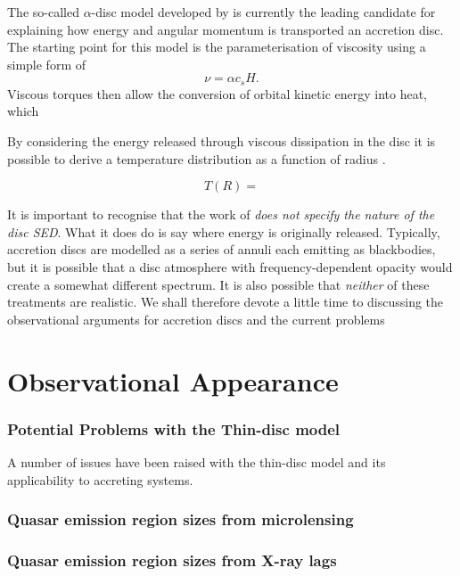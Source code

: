 The so-called $\alpha$-disc model developed by \cite[][hereafter SS73]{shakurasunyaev1973} is
currently the leading candidate for explaining how energy and angular momentum
is transported an accretion disc. The starting point for this model is the parameterisation
of viscosity using a simple form of
\begin{equation}
\nu = \alpha c_s H.
\end{equation}
Viscous torques then allow the conversion of orbital kinetic energy into heat, which 


By considering the energy released through viscous dissipation 
in the disc it is possible to derive a temperature distribution as a function of 
radius \citep{shakurasunyaev1973, fkrbook}. 

\begin{equation}
T(R) =  
\end{equation}

It is important to recognise that the work of \cite{shakurasunyaev1973} 
{\sl does not specify the nature of the disc SED}. What it does do is 
say where energy is originally released. Typically,
accretion discs are modelled as a series of annuli each emitting 
as blackbodies, but it is possible that a disc atmosphere with frequency-dependent
opacity would create a somewhat different spectrum. It is also possible that {\em neither} of these 
treatments are realistic. We shall therefore devote a little time to discussing
the observational arguments for accretion discs and the current problems 


\section{Observational Appearance}



\subsubsection{Potential Problems with the Thin-disc model}

A number of issues have been raised with the thin-disc model and
its applicability to accreting systems. 

\subsubsection{Quasar emission region sizes from microlensing}

\subsubsection{Quasar emission region sizes from X-ray lags}

